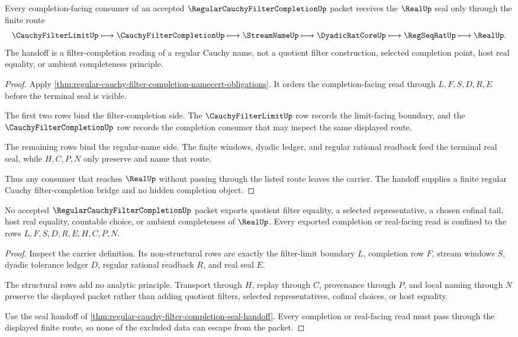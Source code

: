 \begin{theorem}
\label{thm:regular-cauchy-filter-completion-seal-handoff}
Every completion-facing consumer of an accepted $\RegularCauchyFilterCompletionUp$ packet receives the $\RealUp$ seal only through the finite route
$$
\CauchyFilterLimitUp \longmapsto \CauchyFilterCompletionUp \longmapsto \StreamNameUp \longmapsto \DyadicRatCoreUp \longmapsto \RegSeqRatUp \longmapsto \RealUp .
$$
The handoff is a filter-completion reading of a regular Cauchy name, not a quotient filter construction, selected completion point, host real equality, or ambient completeness principle.
\end{theorem}
\begin{proof}
Apply \autoref{thm:regular-cauchy-filter-completion-namecert-obligations}. It orders the completion-facing read through $L,F,S,D,R,E$ before the terminal seal is visible.

The first two rows bind the filter-completion side. The $\CauchyFilterLimitUp$ row records the limit-facing boundary, and the $\CauchyFilterCompletionUp$ row records the completion consumer that may inspect the same displayed route.

The remaining rows bind the regular-name side. The finite windows, dyadic ledger, and regular rational readback feed the terminal real seal, while $H,C,P,N$ only preserve and name that route.

Thus any consumer that reaches $\RealUp$ without passing through the listed route leaves the carrier. The handoff supplies a finite regular Cauchy filter-completion bridge and no hidden completion object.
\end{proof}

\begin{theorem}
\label{thm:regular-cauchy-filter-completion-nonescape}
No accepted $\RegularCauchyFilterCompletionUp$ packet exports quotient filter equality, a selected representative, a chosen cofinal tail, host real equality, countable choice, or ambient completeness of $\RealUp$. Every exported completion or real-facing read is confined to the rows $L,F,S,D,R,E,H,C,P,N$.
\end{theorem}
\begin{proof}
Inspect the carrier definition. Its non-structural rows are exactly the filter-limit boundary $L$, completion row $F$, stream windows $S$, dyadic tolerance ledger $D$, regular rational readback $R$, and real seal $E$.

The structural rows add no analytic principle. Transport through $H$, replay through $C$, provenance through $P$, and local naming through $N$ preserve the displayed packet rather than adding quotient filters, selected representatives, cofinal choices, or host equality.

Use the seal handoff of \autoref{thm:regular-cauchy-filter-completion-seal-handoff}. Every completion or real-facing read must pass through the displayed finite route, so none of the excluded data can escape from the packet.
\end{proof}


